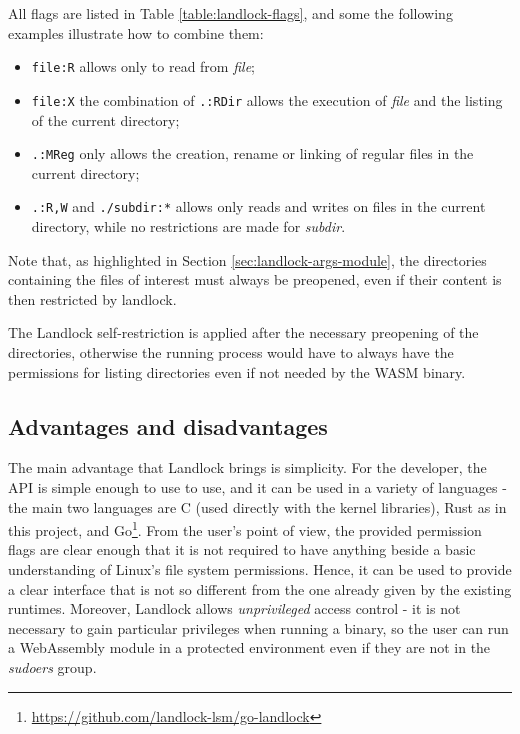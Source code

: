 All flags are listed in Table \ref{table:landlock-flags}, and some the following examples illustrate how to combine them:
\begin{itemize}
  \item \texttt{file:R} allows only to read from \textit{file};
  \item \texttt{file:X} the combination of \texttt{.:RDir} allows the execution of \textit{file} and the listing of the current directory;
  \item \texttt{.:MReg} only allows the creation, rename or linking of regular files in the current directory;
  \item \texttt{.:R,W} and \texttt{./subdir:*} allows only reads and writes on files in the current directory, while no restrictions are
        made for \textit{subdir}.
\end{itemize}

Note that, as highlighted in Section \ref{sec:landlock-args-module}, the directories containing the files of interest
must always be preopened, even if their content is then restricted by landlock.

The Landlock self-restriction is applied after the necessary preopening of the directories,
otherwise the running process would have to always have the permissions for listing directories even if
not needed by the WASM binary.

\subsection{Advantages and disadvantages}

The main advantage that Landlock brings is simplicity. For the developer, the API is simple enough to use
to use, and it can be used in a variety of languages - the main two languages are C (used directly with the kernel libraries),
Rust as in this project, and Go\footnote{\url{https://github.com/landlock-lsm/go-landlock}}.
From the user's point of view, the provided permission flags are clear enough that it is not required to have
anything beside a basic understanding of Linux's file system permissions.
Hence, it can be used to provide a clear interface that is not so different from the one already given by
the existing runtimes.
Moreover, Landlock allows \textit{unprivileged} access control - it is not necessary to gain particular privileges
when running a binary, so the user can run a WebAssembly module in a protected environment even if they are not
in the \textit{sudoers} group.

